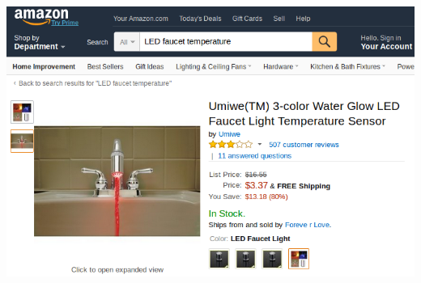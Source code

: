 \documentclass{beamer}
\begin{document}
\begin{frame}
        \includegraphics[width=\textwidth]{Bilder/faucet1.png}
        
\end{frame}





	
\end{document}
